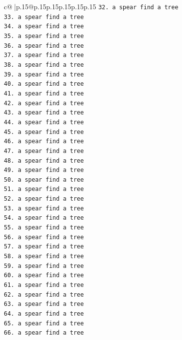 \documentclass{article}
\begin{document}
{\begin{supertabular}{c@{$\;$}|p{.15\linewidth}@{}p{.15\linewidth}p{.15\linewidth}p{.15\linewidth}p{.15\linewidth}p{.15\linewidth}}
{{{\texttt{32. a spear find a tree} \\
\texttt{33. a spear find a tree} \\
\texttt{34. a spear find a tree} \\
\texttt{35. a spear find a tree} \\
\texttt{36. a spear find a tree} \\
\texttt{37. a spear find a tree} \\
\texttt{38. a spear find a tree} \\
\texttt{39. a spear find a tree} \\
\texttt{40. a spear find a tree} \\
\texttt{41. a spear find a tree} \\
\texttt{42. a spear find a tree} \\
\texttt{43. a spear find a tree} \\
\texttt{44. a spear find a tree} \\
\texttt{45. a spear find a tree} \\
\texttt{46. a spear find a tree} \\
\texttt{47. a spear find a tree} \\
\texttt{48. a spear find a tree} \\
\texttt{49. a spear find a tree} \\
\texttt{50. a spear find a tree} \\
\texttt{51. a spear find a tree} \\
\texttt{52. a spear find a tree} \\
\texttt{53. a spear find a tree} \\
\texttt{54. a spear find a tree} \\
\texttt{55. a spear find a tree} \\
\texttt{56. a spear find a tree} \\
\texttt{57. a spear find a tree} \\
\texttt{58. a spear find a tree} \\
\texttt{59. a spear find a tree} \\
\texttt{60. a spear find a tree} \\
\texttt{61. a spear find a tree} \\
\texttt{62. a spear find a tree} \\
\texttt{63. a spear find a tree} \\
\texttt{64. a spear find a tree} \\
\texttt{65. a spear find a tree} \\
\texttt{66. a spear find a tree} \\
}}}
\end{supertabular}}
\end{document}
